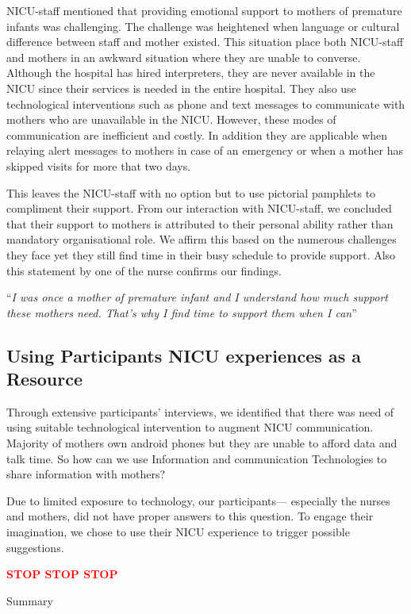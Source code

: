 NICU-staff mentioned that providing emotional support to mothers of premature infants was challenging. The challenge was heightened when language or cultural difference between staff and mother existed. This situation place both NICU-staff and mothers in an awkward situation where they are unable to converse. Although the hospital has hired interpreters, they are never available in the NICU since their services is needed in the entire hospital. They also use technological interventions such as phone and text messages to communicate with mothers who are unavailable in the NICU. However, these modes of communication are inefficient and costly. In addition they are applicable when relaying alert messages to mothers in case of an emergency or when a mother has skipped visits for more that two days. 

This leaves the NICU-staff with no option but to use pictorial pamphlets to compliment their support. From our interaction with NICU-staff, we concluded that their support to mothers is attributed to their personal ability rather than mandatory organisational role. We affirm this based on the numerous challenges they face yet they still find time in their busy schedule to provide support. Also this statement by one of the nurse confirms our findings.

\enquote{\itshape I was once a mother of premature infant and I understand how much support these mothers need. That's why I find time to support them when I can}


\subsection{Using Participants NICU experiences as a Resource}
Through extensive  participants' interviews, we identified that there was need of using suitable technological intervention to augment NICU communication. Majority of mothers own android phones but they are unable to afford data and talk time. So how can we use Information and communication Technologies to  share information with mothers?

Due to limited exposure to technology, our participants--- especially the nurses and mothers, did not have proper answers to this question. To engage their imagination, we chose to use their NICU experience to trigger possible  suggestions.

\textcolor{red}{\textbf{STOP STOP STOP}}



Summary

